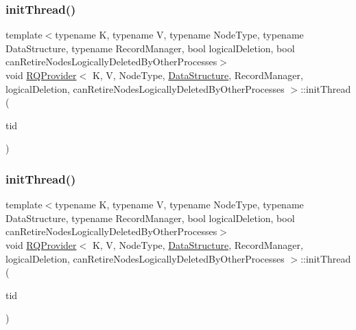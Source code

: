 \mbox{\label{classRQProvider_a3485da4cb5f94a1229cd31578b088f85}} 
\subsubsection{\texorpdfstring{init\+Thread()}{initThread()}\hspace{0.1cm}{\footnotesize\ttfamily [1/5]}}
{\footnotesize\ttfamily template$<$typename K, typename V, typename Node\+Type, typename Data\+Structure, typename Record\+Manager, bool logical\+Deletion, bool can\+Retire\+Nodes\+Logically\+Deleted\+By\+Other\+Processes$>$ \\
void \hyperlink{classRQProvider}{R\+Q\+Provider}$<$ K, V, Node\+Type, \hyperlink{classDataStructure}{Data\+Structure}, Record\+Manager, logical\+Deletion, can\+Retire\+Nodes\+Logically\+Deleted\+By\+Other\+Processes $>$\+::init\+Thread (\begin{DoxyParamCaption}\item[{const int}]{tid }\end{DoxyParamCaption})\hspace{0.3cm}{\ttfamily [inline]}}

\mbox{\label{classRQProvider_a3485da4cb5f94a1229cd31578b088f85}} 
\subsubsection{\texorpdfstring{init\+Thread()}{initThread()}\hspace{0.1cm}{\footnotesize\ttfamily [2/5]}}
{\footnotesize\ttfamily template$<$typename K, typename V, typename Node\+Type, typename Data\+Structure, typename Record\+Manager, bool logical\+Deletion, bool can\+Retire\+Nodes\+Logically\+Deleted\+By\+Other\+Processes$>$ \\
void \hyperlink{classRQProvider}{R\+Q\+Provider}$<$ K, V, Node\+Type, \hyperlink{classDataStructure}{Data\+Structure}, Record\+Manager, logical\+Deletion, can\+Retire\+Nodes\+Logically\+Deleted\+By\+Other\+Processes $>$\+::init\+Thread (\begin{DoxyParamCaption}\item[{const int}]{tid }\end{DoxyParamCaption})\hspace{0.3cm}{\ttfamily [inline]}}

